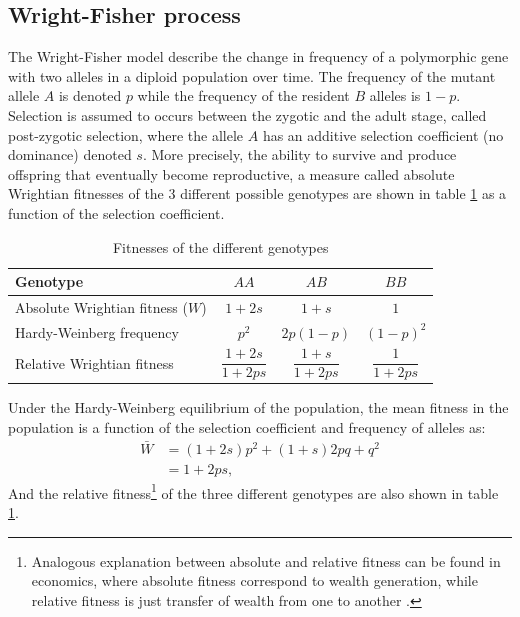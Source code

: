 \subsection{Wright-Fisher process}

The Wright-Fisher model describe the change in frequency of a \gls{polymorphic} gene with two alleles in a \gls{diploid} population over time. 
The frequency of the mutant \gls{allele} $A$ is denoted $p$ while the frequency of the resident $B$ alleles is $1-p$.
Selection is assumed to occurs between the zygotic and the adult stage, called post-zygotic selection, where the \gls{allele} $A$ has an additive selection coefficient (no dominance) denoted $s$.
More precisely, the ability to survive and produce offspring that eventually become reproductive, a measure called absolute Wrightian fitnesses of the $3$ different possible genotypes are shown in table \ref{table:fitnesses} as a function of the selection coefficient.

\begin{table}[H]
	\begin{center}
		\begin{tabular}{|l|ccc|}
			\hline
			Genotype & $AA$ & $AB$ & $BB$ \\
			\hline
			Absolute Wrightian fitness ($W$) & $1+2s$ & $1+s$ & $1$ \\
			Hardy-Weinberg frequency & $p^2$ & $2p(1-p)$ & $(1-p)^2$ \\
			Relative Wrightian fitness & $\dfrac{1+2s}{1+2ps}$ & $\dfrac{1+s}{1+2ps}$ & $\dfrac{1}{1+2ps}$ \\
			\hline
		\end{tabular}
	\end{center}
	\caption[Fitnesses of the different genotypes]{Fitnesses of the different genotypes}\label{table:fitnesses}
\end{table}

Under the Hardy-Weinberg equilibrium of the population, the mean fitness in the population is a function of the selection coefficient and frequency of alleles as:
\begin{align}
\bar{W} &= (1+2s)p^2 + (1+s)2pq + q^2 \\
&= 1 + 2ps,
\end{align}
And the relative fitness\footnote{Analogous explanation between absolute and relative fitness can be found in economics, where absolute fitness correspond to wealth generation, while relative fitness is just transfer of wealth from one to another \citep{Masel2016}.} of the three different genotypes are also shown in table \ref{table:fitnesses}. 

